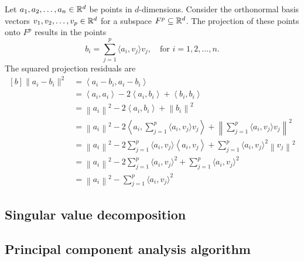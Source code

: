 Let \(a_1, a_2, \dots, a_n \in \mathbb{R}^d\) be points in \(d\)-dimensions.
Consider the orthonormal basis vectors \(v_1, v_2, \dots, v_p \in \mathbb{R}^d\) for a subspace \(F^p \subseteq \mathbb{R}^d\).
The projection of these points onto \(F^p\) results in the points
\begin{equation}
    b_i = \sum_{j=1}^{p} \langle a_i, v_j \rangle v_j, \quad \text{for \(i = 1,2,\dots, n\)}.
\end{equation}
The squared projection residuals are
\begin{equation}
    \begin{aligned}[b]
        \|a_i - b_i\|^2
        &= \left\langle a_i - b_i, a_i - b_i\right\rangle \\
        &= \left\langle a_i, a_i \right\rangle
        - 2\left\langle a_i, b_i \right\rangle
        + \left\langle b_i, b_i \right\rangle \\
        &= \left\| a_i \right\|^2
        - 2\left\langle a_i, b_i \right\rangle
        + \left\| b_i \right\|^2 \\
        &= \left\| a_i \right\|^2
        - 2\left\langle a_i, \sum_{j=1}^{p} \langle a_i, v_j \rangle v_j \right\rangle
        + \left\| \sum_{j=1}^{p} \langle a_i, v_j \rangle v_j \right\|^2 \\
        &= \left\| a_i \right\|^2
        - 2\sum_{j=1}^{p} \langle a_i, v_j \rangle \left\langle a_i,  v_j \right\rangle
        + \sum_{j=1}^{p} \langle a_i, v_j \rangle^2 \left\|  v_j \right\|^2 \\
        &= \left\| a_i \right\|^2
        - 2\sum_{j=1}^{p} \langle a_i, v_j \rangle^2
        + \sum_{j=1}^{p} \langle a_i, v_j \rangle^2 \\
        &= \left\| a_i \right\|^2
        - \sum_{j=1}^{p} \langle a_i, v_j \rangle^2
    \end{aligned}
\end{equation}


\subsection{Singular value decomposition}


\subsection{Principal component analysis algorithm}

